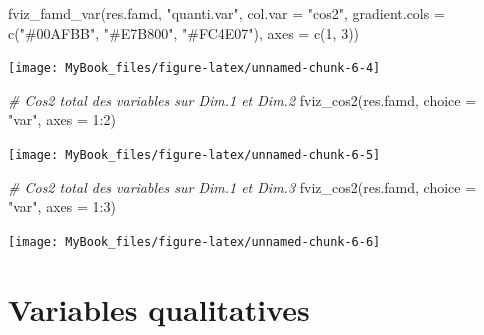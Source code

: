 \documentclass[
  12pt,
  american,
  a4paper,
  extrafontsizes,onecolumn,openright
  ]{memoir}
\newenvironment{Shaded}{\begin{snugshade}}{\end{snugshade}}
\newcommand{\AttributeTok}[1]{\textcolor[rgb]{0.77,0.63,0.00}{#1}}
\newcommand{\CommentTok}[1]{\textcolor[rgb]{0.56,0.35,0.01}{\textit{#1}}}
\newcommand{\DecValTok}[1]{\textcolor[rgb]{0.00,0.00,0.81}{#1}}
\newcommand{\FunctionTok}[1]{\textcolor[rgb]{0.00,0.00,0.00}{#1}}
\newcommand{\NormalTok}[1]{#1}
\newcommand{\SpecialCharTok}[1]{\textcolor[rgb]{0.00,0.00,0.00}{#1}}
\newcommand{\StringTok}[1]{\textcolor[rgb]{0.31,0.60,0.02}{#1}}
\begin{document}
\begin{Shaded}
\begin{Highlighting}[]
\FunctionTok{fviz\_famd\_var}\NormalTok{(res.famd, }\StringTok{"quanti.var"}\NormalTok{, }\AttributeTok{col.var =} \StringTok{"cos2"}\NormalTok{, }\AttributeTok{gradient.cols =} \FunctionTok{c}\NormalTok{(}\StringTok{"\#00AFBB"}\NormalTok{,}
    \StringTok{"\#E7B800"}\NormalTok{, }\StringTok{"\#FC4E07"}\NormalTok{), }\AttributeTok{axes =} \FunctionTok{c}\NormalTok{(}\DecValTok{1}\NormalTok{, }\DecValTok{3}\NormalTok{))}
\end{Highlighting}
\end{Shaded}

\begin{center}\texttt{[image: MyBook\_files/figure-latex/unnamed-chunk-6-4]} \end{center}

\begin{Shaded}
\begin{Highlighting}[]
\CommentTok{\# Cos2 total des variables sur Dim.1 et Dim.2}
\FunctionTok{fviz\_cos2}\NormalTok{(res.famd, }\AttributeTok{choice =} \StringTok{"var"}\NormalTok{, }\AttributeTok{axes =} \DecValTok{1}\SpecialCharTok{:}\DecValTok{2}\NormalTok{)}
\end{Highlighting}
\end{Shaded}

\begin{center}\texttt{[image: MyBook\_files/figure-latex/unnamed-chunk-6-5]} \end{center}

\begin{Shaded}
\begin{Highlighting}[]
\CommentTok{\# Cos2 total des variables sur Dim.1 et Dim.3}
\FunctionTok{fviz\_cos2}\NormalTok{(res.famd, }\AttributeTok{choice =} \StringTok{"var"}\NormalTok{, }\AttributeTok{axes =} \DecValTok{1}\SpecialCharTok{:}\DecValTok{3}\NormalTok{)}
\end{Highlighting}
\end{Shaded}

\begin{center}\texttt{[image: MyBook\_files/figure-latex/unnamed-chunk-6-6]} \end{center}

\normalsize

\hypertarget{variables-qualitatives}{%
\section{Variables qualitatives}\label{variables-qualitatives}}
\end{document}
